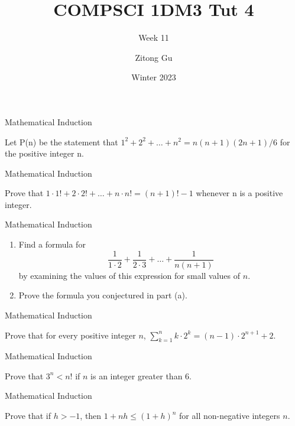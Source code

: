 \documentclass{beamer}
\title{COMPSCI 1DM3 Tut 4}
\subtitle{Week 11}
\author{Zitong Gu}
\institute{McMaster University}
\date{Winter 2023}
\let\cd\cdot
\begin{document}
\frame{\titlepage}

\begin{frame}[t]{Mathematical Induction}
    \begin{example}
        Let P(n) be the statement that $1^2 + 2^2 + \dots + n^2 = n(n + 1)(2n + 1)/6$ for the positive integer n.
    \end{example}
\end{frame}

\begin{frame}[t]{Mathematical Induction}
    \begin{example}
        Prove that $1 \cdot 1! + 2 \cdot 2! + \dots + n \cdot n! = (n + 1)! - 1$ whenever n is a positive integer.
    \end{example}
\end{frame}

\begin{frame}[t]{Mathematical Induction}
    \begin{example}
        \begin{enumerate}
            \item Find a formula for $$\dfrac{1}{1 \cd 2} + \dfrac{1}{2 \cd 3} + \dots + \dfrac{1}{n(n+1)}$$ by examining the values of this expression for small values of $n$.
            \item Prove the formula you conjectured in part (a). 
        \end{enumerate}
    \end{example}
\end{frame}

\begin{frame}[t]{Mathematical Induction}
    \begin{example}
        Prove that for every positive integer $n$, $\sum_{k=1}^n k \cd 2^k = (n-1)\cd 2^{n+1} + 2$.
    \end{example}
\end{frame}

\begin{frame}[t]{Mathematical Induction}
    \begin{example}
        Prove that $3^n < n!$ if $n$ is an integer greater than $6$.
    \end{example}
\end{frame}

\begin{frame}[t]{Mathematical Induction}
    \begin{example}
        Prove that if $h > -1$, then $1 + nh \leq (1 + h)^n$ for all non-negative integers $n$.
    \end{example}
\end{frame}
\end{document}
